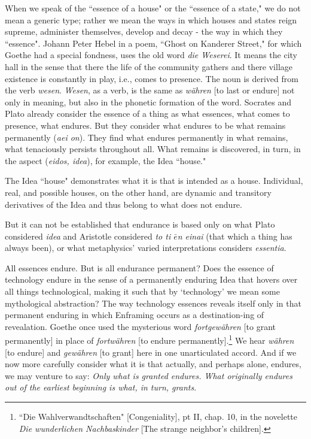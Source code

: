 \documentclass[paper=a4, fontsize=11pt,twoside]{scrartcl}
\begin{document}
When we speak of the ``essence of a house" or the ``essence of a state," we do not mean a generic type; rather we mean the ways in which houses and states reign supreme, administer themselves, develop and decay - the way in which they ``essence". Johann Peter Hebel in a poem, ``Ghost on Kanderer Street," for which Goethe had a special fondness, uses the old word \textit{die Weserei}. It means the city hall in the sense that there the life of the community gathers and there village existence is constantly in play, i.e., comes to presence. The noun is derived from the verb \textit{wesen}. \textit{Wesen}, as a verb, is the same as \textit{w{\"a}hren} [to last or endure] not only in meaning, but also in the phonetic formation of the word. Socrates and Plato already consider the essence of a thing as what essences, what comes to presence, what endures. But they consider what endures to be what remains permanently (\textit{aei on}). They find what endures permanently in what remains, what tenaciously persists throughout all. What remains is discovered, in turn, in the aspect (\textit{eidos, idea}), for example, the Idea ``house."

The Idea ``house" demonstrates what it is that is intended as a house. Individual, real, and possible houses, on the other hand, are dynamic and transitory derivatives of the Idea and thus belong to what does not endure.

But it can not be established that endurance is based only on what Plato considered \textit{idea} and Aristotle considered \textit{to ti $\bar{e}$n einai} (that which a thing has always been), or what metaphysics' varied interpretations considers \textit{essentia}.

All essences endure. But is all endurance permanent? Does the essence of technology endure in the sense of a permanently enduring Idea that hovers over all things technological, making it such that by `technology' we mean some mythological abstraction? The way technology essences reveals itself only in that permanent enduring in which Enframing occurs as a destination-ing of revealation. Goethe once used the mysterious word \textit{fortgew{\"a}hren} [to grant permanently] in place of \textit{fortw{\"a}hren} [to endure permanently].\footnote[3]{``Die Wahlverwandtschaften" [Congeniality], pt II, chap. 10, in the novelette \textit{Die wunderlichen Nachbaskinder} [The strange neighbor's children].} We hear \textit{w{\"a}hren} [to endure] and \textit{gew{\"a}hren} [to grant] here in one unarticulated accord. And if we now more carefully consider what it is that actually, and perhaps alone, endures, we may venture to say: \textit{Only what is granted endures. What originally endures out of the earliest beginning is what, in turn, grants}. 
\end{document}

